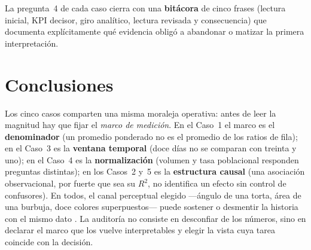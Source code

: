 \documentclass[12pt,a4paper]{article}
\begin{document}
La pregunta~4 de cada caso cierra con una \textbf{bitácora} de cinco frases (lectura inicial, KPI decisor, giro analítico, lectura revisada y consecuencia) que documenta explícitamente qué evidencia obligó a abandonar o matizar la primera interpretación.







\section{Conclusiones}

Los cinco casos comparten una misma moraleja operativa: antes de leer la magnitud hay que fijar el \emph{marco de medición}. En el Caso~1 el marco es el \textbf{denominador} (un promedio ponderado no es el promedio de los ratios de fila); en el Caso~3 es la \textbf{ventana temporal} (doce días no se comparan con treinta y uno); en el Caso~4 es la \textbf{normalización} (volumen y tasa poblacional responden preguntas distintas); en los Casos~2 y~5 es la \textbf{estructura causal} (una asociación observacional, por fuerte que sea su $R^2$, no identifica un efecto sin control de confusores). En todos, el canal perceptual elegido —ángulo de una torta, área de una burbuja, doce colores superpuestos— puede sostener o desmentir la historia con el mismo dato \citep{cleveland1984graphical,munzner2014visualization}. La auditoría no consiste en desconfiar de los números, sino en declarar el marco que los vuelve interpretables y elegir la vista cuya tarea coincide con la decisión.
\end{document}
